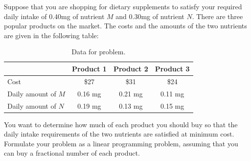 %



\begin{ex} \label{ex:lp-diet-problem}
Suppose that you are shopping for dietary supplements to satisfy your
required daily intake of 0.40mg of nutrient \(M\) and 0.30mg of
nutrient \(N\). There are three popular products on the market. The
costs and the amounts of the two nutrients are given in the following
table:

\begin{table}[h!]
\centering
\begin{tabular}{lccc}
\toprule
         & Product 1 & Product 2 & Product 3 \\ \midrule
Cost     & \$27      & \$31      & \$24      \\
Daily amount of \(M\) & 0.16 mg   & 0.21 mg   & 0.11 mg   \\
Daily amount of \(N\) & 0.19 mg   & 0.13 mg   & 0.15 mg   \\ \bottomrule
\end{tabular}
\caption{Data for problem.}
\label{tab:your_table_label}
\end{table}

You want to determine how much of each product you should buy so that
the daily intake requirements of the two nutrients are satisfied at
minimum cost. Formulate your problem as a linear programming problem,
assuming that you can buy a fractional number of each product.
\end{ex}


